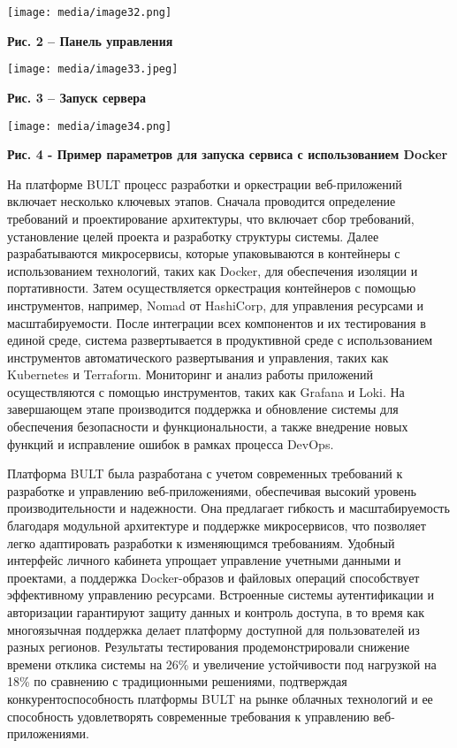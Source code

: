 \documentclass[
]{article}
\begin{document}
\texttt{[image: media/image32.png]}

\textbf{Рис. 2 -- Панель управления}

\texttt{[image: media/image33.jpeg]}

\textbf{Рис. 3 -- Запуск сервера}

\texttt{[image: media/image34.png]}

\textbf{Рис. 4 - Пример параметров для запуска сервиса с использованием
Docker}

На платформе BULT процесс разработки и оркестрации веб-приложений
включает несколько ключевых этапов. Сначала проводится определение
требований и проектирование архитектуры, что включает сбор требований,
установление целей проекта и разработку структуры системы. Далее
разрабатываются микросервисы, которые упаковываются в контейнеры с
использованием технологий, таких как Docker, для обеспечения изоляции и
портативности. Затем осуществляется оркестрация контейнеров с помощью
инструментов, например, Nomad от HashiCorp, для управления ресурсами и
масштабируемости. После интеграции всех компонентов и их тестирования в
единой среде, система развертывается в продуктивной среде с
использованием инструментов автоматического развертывания и управления,
таких как Kubernetes и Terraform. Мониторинг и анализ работы приложений
осуществляются с помощью инструментов, таких как Grafana и Loki. На
завершающем этапе производится поддержка и обновление системы для
обеспечения безопасности и функциональности, а также внедрение новых
функций и исправление ошибок в рамках процесса DevOps.

Платформа BULT была разработана с учетом современных требований к
разработке и управлению веб-приложениями, обеспечивая высокий уровень
производительности и надежности. Она предлагает гибкость и
масштабируемость благодаря модульной архитектуре и поддержке
микросервисов, что позволяет легко адаптировать разработки к
изменяющимся требованиям. Удобный интерфейс личного кабинета упрощает
управление учетными данными и проектами, а поддержка Docker-образов и
файловых операций способствует эффективному управлению ресурсами.
Встроенные системы аутентификации и авторизации гарантируют защиту
данных и контроль доступа, в то время как многоязычная поддержка делает
платформу доступной для пользователей из разных регионов. Результаты
тестирования продемонстрировали снижение времени отклика системы на 26\%
и увеличение устойчивости под нагрузкой на 18\% по сравнению с
традиционными решениями, подтверждая конкурентоспособность платформы
BULT на рынке облачных технологий и ее способность удовлетворять
современные требования к управлению веб-приложениями.
\end{document}
